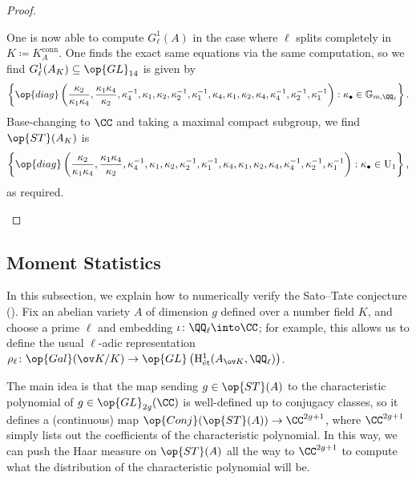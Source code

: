 \documentclass[../thesis.tex]{subfiles}
\begin{document}
\begin{proof}
\begin{enumerate}
		One is now able to compute $G_\ell^1(A)$ in the case where $\ell$ splits completely in $K\coloneqq K_A^{\mathrm{conn}}$. One finds the exact same equations via the same computation, so we find $G_\ell^1(A_K)\subseteq\op{GL}_{14}$ is given by
		\[\left\{\op{diag}\left(\frac{\kappa_2}{\kappa_1\kappa_4},\frac{\kappa_1\kappa_4}{\kappa_2},\kappa_4^{-1},\kappa_1,\kappa_2,\kappa_2^{-1},\kappa_1^{-1},\kappa_4,\kappa_1,\kappa_2,\kappa_4,\kappa_4^{-1},\kappa_2^{-1},\kappa_1^{-1}\right):\kappa_\bullet\in\mathbb G_{m,\QQ_\ell}\right\}.\]
		Base-changing to $\CC$ and taking a maximal compact subgroup, we find $\op{ST}(A_K)$ is
		\[\left\{\op{diag}\left(\frac{\kappa_2}{\kappa_1\kappa_4},\frac{\kappa_1\kappa_4}{\kappa_2},\kappa_4^{-1},\kappa_1,\kappa_2,\kappa_2^{-1},\kappa_1^{-1},\kappa_4,\kappa_1,\kappa_2,\kappa_4,\kappa_4^{-1},\kappa_2^{-1},\kappa_1^{-1}\right):\kappa_\bullet\in\mathrm U_1\right\},\]
		as required.
		\qedhere
	\end{enumerate}
\end{proof}

\subsection{Moment Statistics}
In this subsection, we explain how to numerically verify the Sato--Tate conjecture (). Fix an abelian variety $A$ of dimension $g$ defined over a number field $K$, and choose a prime $\ell$ and embedding $\iota\colon\QQ_\ell\into\CC$; for example, this allows us to define the usual $\ell$-adic representation $\rho_\ell\colon\op{Gal}(\ov K/K)\to\op{GL}\left(\mathrm H^1_{\mathrm{\acute et}}(A_{\ov K},\QQ_\ell)\right)$.

The main idea is that the map sending $g\in\op{ST}(A)$ to the characteristic polynomial of $g\in\op{GL}_{2g}(\CC)$ is well-defined up to conjugacy classes, so it defines a (continuous) map $\op{Conj}(\op{ST}(A))\to\CC^{2g+1}$, where $\CC^{2g+1}$ simply lists out the coefficients of the characteristic polynomial. In this way, we can push the Haar measure on $\op{ST}(A)$ all the way to $\CC^{2g+1}$ to compute what the distribution of the characteristic polynomial will be.
\end{document}
